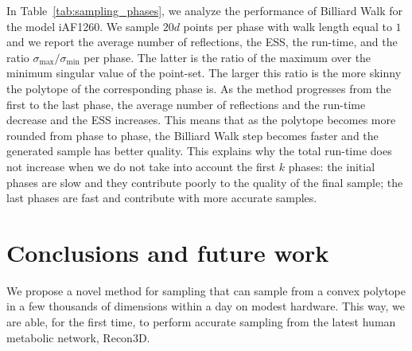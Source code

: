    In Table~\ref{tab:sampling_phases}, we analyze the
   performance of
   Billiard Walk for the model iAF1260. We sample $20d$ points per
   phase with walk length equal to $1$ and we report the average number of
   reflections, the ESS, the run-time, and the ratio $\sigma_{\max} / \sigma_{\min}$
   per phase. The latter is the ratio of the maximum over the minimum singular
   value of the point-set. The larger this ratio is the more skinny the polytope of
   the corresponding phase is. As the method progresses from the first to the last
   phase, the average number of reflections and the run-time decrease and the ESS
   increases. This means that as the polytope becomes more rounded from phase to
   phase, the Billiard Walk step becomes faster and the generated sample has better
   quality. This explains why the total run-time does not increase when we do not
   take into account the first  $k$ phases: the initial phases are slow and
   they  contribute poorly to the  quality of the final sample; the last phases are
   fast and contribute with more accurate samples.
 
 
 
 \section{Conclusions and future work}
 \label{sec:conclusion}
 
   We propose a novel method for sampling that can sample from a convex
   polytope in a few thousands of dimensions within a day on modest hardware. 
   This way, we are able, for the first time, to perform accurate sampling from the
   latest human metabolic network, Recon3D.

